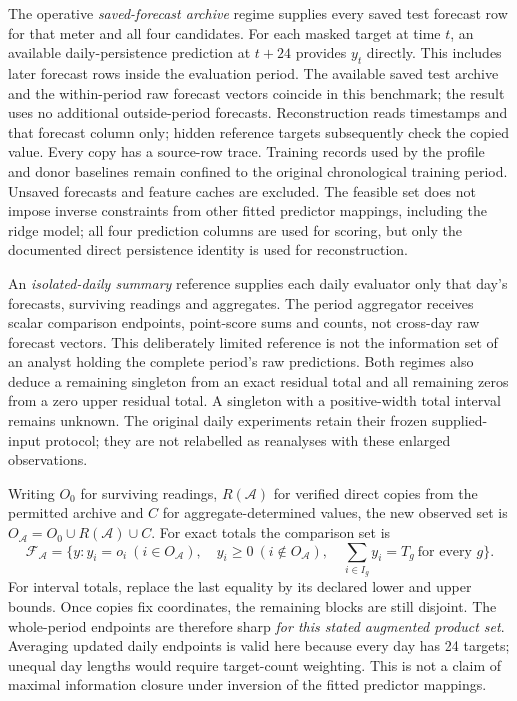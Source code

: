 \documentclass[12pt]{article}
\newcommand{\F}{\mathcal{F}}
\begin{document}
The operative \emph{saved-forecast archive} regime supplies every saved
test forecast row for that meter and all four candidates. For each masked
target at time $t$, an available daily-persistence prediction at $t+24$
provides $y_t$ directly. This includes later forecast rows inside the
evaluation period. The available saved test archive and the within-period
raw forecast vectors coincide in this benchmark; the result uses no
additional outside-period forecasts. Reconstruction reads timestamps and that forecast
column only; hidden reference targets subsequently check the copied value.
Every copy has a source-row trace. Training records used by the profile
and donor baselines remain confined to the original chronological training
period. Unsaved forecasts and feature caches are excluded. The feasible set
does not impose inverse constraints from other fitted predictor mappings,
including the ridge model; all four prediction columns are used for scoring,
but only the documented direct persistence identity is used for reconstruction.

An \emph{isolated-daily summary} reference supplies each daily evaluator
only that day's forecasts, surviving readings and aggregates. The period
aggregator receives scalar comparison endpoints, point-score sums and
counts, not cross-day raw forecast vectors. This deliberately limited
reference is not the information set of an analyst holding the complete
period's raw predictions. Both regimes also deduce a remaining singleton
from an exact residual total and all remaining zeros from a zero upper
residual total. A singleton with a positive-width total interval remains
unknown. The original daily experiments retain their frozen supplied-input
protocol; they are not relabelled as reanalyses with these enlarged observations.

Writing $O_0$ for surviving readings, $R(\mathcal A)$ for verified direct
copies from the permitted archive and $C$ for aggregate-determined values,
the new observed set is $O_{\mathcal A}=O_0\cup R(\mathcal A)\cup C$.
For exact totals the comparison set is
\begin{equation}
 \F_{\mathcal A}=\{y:y_i=o_i\ (i\in O_{\mathcal A}),\quad
 y_i\geq0\ (i\notin O_{\mathcal A}),\quad
 \textstyle\sum_{i\in I_g}y_i=T_g\ \text{for every }g\}.
 \label{eq:archive-set}
\end{equation}
For interval totals, replace the last equality by its declared lower and
upper bounds. Once copies fix coordinates, the remaining blocks are still
disjoint. The whole-period endpoints are therefore sharp \emph{for this
stated augmented product set}. Averaging updated daily endpoints is valid
here because every day has 24 targets; unequal day lengths would require
target-count weighting. This is not a claim of maximal information closure
under inversion of the fitted predictor mappings.
\end{document}
